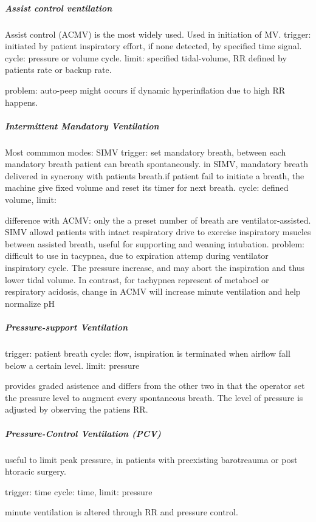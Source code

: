 \documentclass[
  letterpaper,
  DIV=11,
  numbers=noendperiod]{scrreprt}
\let\oldsubparagraph\subparagraph
\renewcommand{\subparagraph}[1]{\oldsubparagraph{#1}\mbox{}}
\begin{document}
\subparagraph{Assist control
ventilation}\label{assist-control-ventilation}

Assist control (ACMV) is the most widely used. Used in initiation of MV.
trigger: initiated by patient inspiratory effort, if none detected, by
specified time signal. cycle: pressure or volume cycle. limit: specified
tidal-volume, RR defined by patients rate or backup rate.

problem: auto-peep might occurs if dynamic hyperinflation due to high RR
happens.

\subparagraph{Intermittent Mandatory
Ventilation}\label{intermittent-mandatory-ventilation}

Most commmon modes: SIMV trigger: set mandatory breath, between each
mandatory breath patient can breath spontaneously. in SIMV, mandatory
breath delivered in syncrony with patients breath.if patient fail to
initiate a breath, the machine give fixed volume and reset its timer for
next breath. cycle: defined volume, limit:

difference with ACMV: only the a preset number of breath are
ventilator-assisted. SIMV allowd patients with intact respiratory drive
to exercise inspiratory msucles between assisted breath, useful for
supporting and weaning intubation. problem: difficult to use in
tacypnea, due to expiration attemp during ventilator inspiratory cycle.
The pressure increase, and may abort the inspiration and thus lower
tidal volume. In contrast, for tachypnea represent of metabocl or
respiratory acidosis, change in ACMV will increase minute ventilation
and help normalize pH

\subparagraph{Pressure-support
Ventilation}\label{pressure-support-ventilation}

trigger: patient breath cycle: flow, isnpiration is terminated when
airflow fall below a certain level. limit: pressure

provides graded asistence and differs from the other two in that the
operator set the pressure level to augment every spontaneous breath. The
level of pressure is adjusted by observing the patiens RR.

\subparagraph{Pressure-Control Ventilation
(PCV)}\label{pressure-control-ventilation-pcv}

useful to limit peak pressure, in patients with preexisting barotreauma
or post htoracic surgery.

trigger: time cycle: time, limit: pressure

minute ventilation is altered through RR and pressure control.
\end{document}
